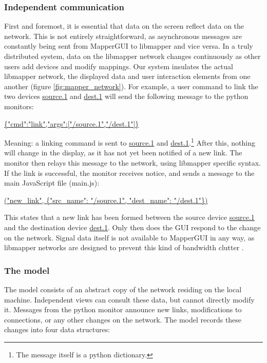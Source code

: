 		\subsubsection{Independent communication}

First and foremost, it is essential that data on the screen reflect data on the network. This is not entirely straightforward, as asynchronous messages are constantly being sent from MapperGUI to libmapper and vice versa. In a truly distributed system, data on the libmapper network changes continuously as other users add devices and modify mappings. Our system insulates the actual libmapper network, the displayed data and user interaction elements from one another (figure \ref{fig:mapper_network}). For example, a user command to link the two devices \url{source.1} and \url{dest.1} will send the following message to the python monitors:

\url{ {"cmd":"link","args":["/source.1","/dest.1"]} }

Meaning: a linking command is sent to \url{source.1} and \url{dest.1}.\footnote{The message itself is a python dictionary.} After this, nothing will change in the display, as it has not yet been notified of a new link. The monitor then relays this message to the network, using libmapper specific syntax. If the link is successful, the monitor receives notice, and sends a message to the main JavaScript file (main.js):

\url{("new_link", {"src_name": "/source.1", "dest_name": "/dest.1"}) }

This states that a new link has been formed between the source device \url{source.1} and the destination device \url{dest.1}. Only then does the GUI respond to the change on the network. Signal data itself is not available to MapperGUI in any way, as libmapper networks are designed to prevent this kind of bandwidth clutter .

		\subsubsection{The model}

The model consists of an abstract copy of the network residing on the local machine. Independent views can consult these data, but cannot directly modify it. Messages from the python monitor announce new links, modifications to connections, or any other changes on the network. The model records these changes into four data structures:

